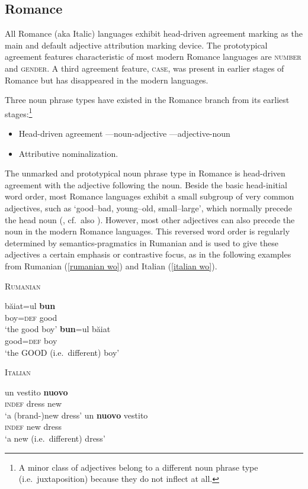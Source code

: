 \subsection{Romance}
All Romance (aka Italic) languages exhibit head-driven agreement marking as the main and default adjective attribution marking device. The prototypical agreement features characteristic of most modern Romance languages are \textsc{number} and \textsc{gender}. A third agreement feature, \textsc{case}, was present in earlier stages of Romance but has disappeared in the modern languages.

Three noun phrase types have existed in the Romance branch from its earliest stages:\footnote{A minor class of adjectives belong to a different noun phrase type (i.e.~juxtaposition) because they do not inflect at all.}
\begin{itemize}
\item{Head-driven agreement}
	\subitem —noun-adjective
	\subitem —adjective-noun
\item{Attributive nominalization.}
\end{itemize}
The unmarked and prototypical noun phrase type in Romance is head-driven agreement with the adjective following the noun. Beside the basic head-initial word order, most Romance languages exhibit a small subgroup of very common adjectives, such as ‘good–bad, young–old, small–large’, which normally precede the head noun (\citealt[146–147]{posner1996}, cf.~also \citealt[340]{silvestri1998}). However, most other adjectives can also precede the noun in the modern Romance languages. This reversed word order is regularly determined by semantics-pragmatics in Rumanian and is used to give these adjectives a certain emphasis or contrastive focus, as in the following examples from Rumanian (\ref{rumanian wo}) and Italian (\ref{italian wo}).
\begin{exe}
\ex
\begin{xlist} 
\ex	\textsc{Rumanian} \citep{beyer-etal1987} \label{rumanian wo} 
\begin{xlist}
\ex	
\gll	băiat=ul \textbf{bun}\\
	boy=\textsc{def} good\\
\glt	‘the good boy’
\ex	
\gll	\textbf{bun}=ul băiat\\
	good=\textsc{def} boy\\
\glt	‘the GOOD (i.e.~different) boy’ 
\end{xlist}
\ex \textsc{Italian} \cite[146]{posner1996} \label{italian wo}
\begin{xlist}
\ex	
\gll	un vestito \textbf{nuovo}\\
	\textsc{indef} dress new\\
\glt	‘a (brand-)new dress’
\ex	
\gll	un \textbf{nuovo} vestito\\
	\textsc{indef} new dress\\
\glt	‘a new (i.e.~different) dress’
\end{xlist}
\end{xlist}
\end{exe}
